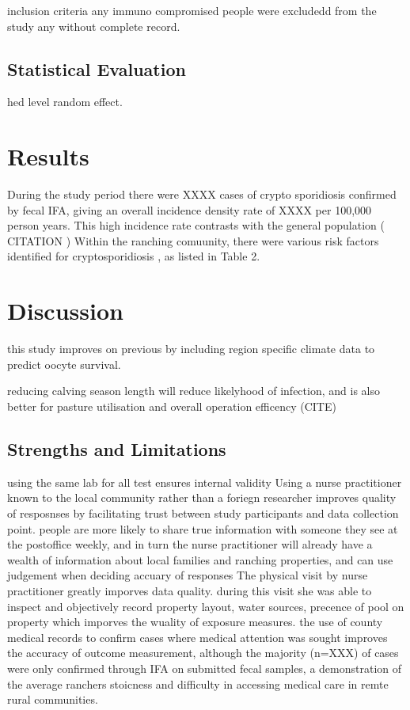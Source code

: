 \documentclass[12pt]{article}
\begin{document}
		inclusion criteria
			any immuno compromised people were excludedd from the study
			any without complete record.

	\subsection{Statistical Evaluation}
		hed level random effect.

	\section{Results}
		During the study period there were XXXX cases of crypto sporidiosis confirmed by fecal IFA, giving an overall incidence density rate of XXXX per 100,000 person years. 
		This high incidence rate contrasts with the general population ( CITATION ) 
		Within the ranching comuunity, there were various risk factors identified for cryptosporidiosis , as listed in Table 2. 


	\section{Discussion} 

		this study improves on previous by including region specific climate data \cite{CIMIS} to predict oocyte survival. 

		reducing calving season length will reduce likelyhood of infection, and is also better for pasture utilisation and overall operation efficency (CITE)	

	\subsection{Strengths and Limitations}
		

		using the same lab for all test ensures internal validity
		Using a nurse practitioner known to the local community rather than a foriegn researcher improves quality of resposnses by facilitating trust between study participants and data collection point. people are more likely to share true information with someone they see at the postoffice weekly, and in turn the nurse practitioner will already have a wealth of information about local families and ranching properties, and can use judgement when deciding accuary of responses
		The physical visit by nurse practitioner greatly imporves data quality. during this visit she was able to inspect and objectively record property layout, water sources, precence of pool on property which imporves the wuality of exposure measures.
		the use of county medical records to confirm cases where medical attention was sought improves the accuracy of outcome measurement, although the majority (n=XXX) of cases were only confirmed through IFA on submitted fecal samples, a demonstration of the average ranchers stoicness and difficulty in accessing medical care in remte rural communities. 
\end{document}
